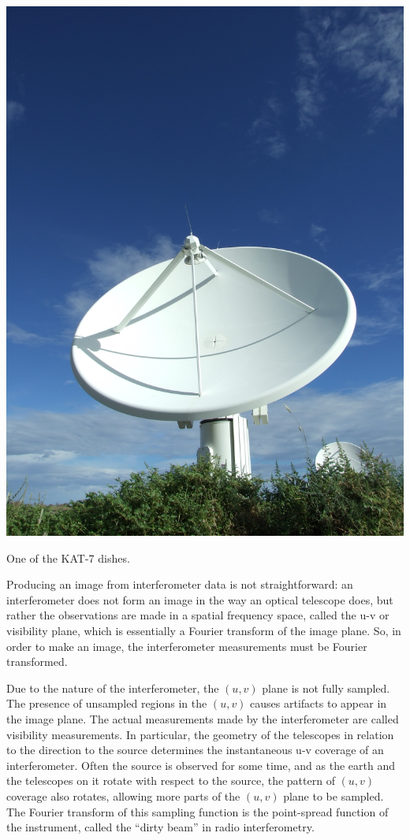\documentclass[force,almostfull,justified]{tufte-book}
\begin{document}
\begin{marginfigure}
 \includegraphics{images/DSCF3329}
 \caption{One of the KAT-7 dishes.}
 \forceversofloat
 \label{fig:marginfig}\end{marginfigure}

Producing an image from interferometer data is not straightforward: an interferometer does not form an
image in the way an optical telescope does, but rather the observations are made in a spatial
frequency space, called the u-v or visibility plane, which is essentially a Fourier transform of the
image plane.  So, in order to make an image, the interferometer measurements must be Fourier
transformed.

Due to the nature of the interferometer, the $(u, v)$ plane is not fully sampled.  The presence of
unsampled regions in the $(u, v)$ causes artifacts to appear in the image plane.  The actual
measurements made by the interferometer are called visibility measurements.  In particular, the
geometry of the telescopes in relation to the direction to the source determines the instantaneous u-v
coverage of an interferometer.  Often the source is observed for some time, and as the earth and the
telescopes on it rotate with respect to the source, the pattern of $(u, v)$ coverage also rotates,
allowing more parts of the $(u, v)$ plane to be sampled. The Fourier transform of this sampling
function is the point-spread function of the instrument, called the ``dirty beam'' in radio
interferometry.
\end{document}
